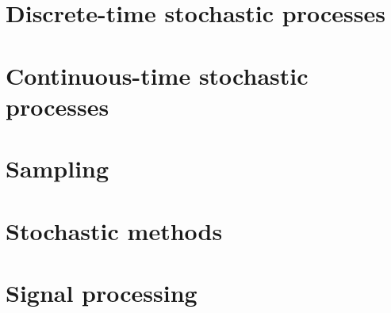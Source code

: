 \documentclass[oneside]{book}
\begin{document}
\part{Discrete-time stochastic processes}







\part{Continuous-time stochastic processes}



\part{Sampling}





\part{Stochastic methods}







\part{Signal processing}





\end{document}
